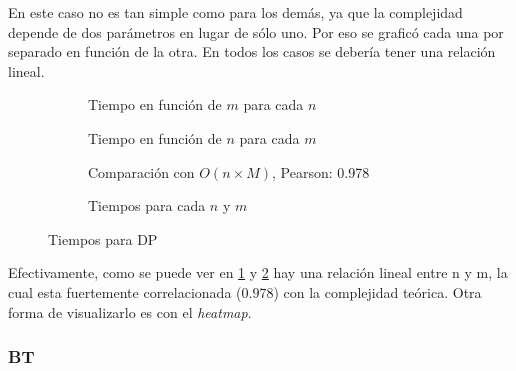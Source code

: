 En este caso no es tan simple como para los demás, ya que la complejidad depende de dos parámetros en lugar de sólo uno. Por eso se graficó cada una por separado en función de la otra. En todos los casos se debería tener una relación lineal.

\begin{figure}[H]
    \centering
    \begin{subfigure}[b]{0.48\textwidth}
        \centering
        
        \caption{Tiempo en función de $m$ para cada $n$}
        \label{fig:comp-dp-nm}
    \end{subfigure}
    \hfill
    \begin{subfigure}[b]{0.48\textwidth}
        \centering
        
        \caption{Tiempo en función de $n$ para cada $m$}
        \label{fig:comp-dp-mn}
    \end{subfigure}
    \hfill
    \begin{subfigure}[b]{0.42\textwidth}
        \centering
        
        \caption{Comparación con $O(n\times M)$, Pearson: 0.978}
    \end{subfigure}
    \hfill
    \begin{subfigure}[b]{0.48\textwidth}
        \centering
        
        \caption{Tiempos para cada $n$ y $m$}
    \end{subfigure}
    \caption{Tiempos para DP}
\end{figure}

Efectivamente, como se puede ver en \ref{fig:comp-dp-nm} y \ref{fig:comp-dp-mn} hay una relación lineal entre n y m, la cual esta fuertemente correlacionada ($0.978$) con la complejidad teórica. Otra forma de visualizarlo es con el \textit{heatmap}.

\subsubsection{BT}

